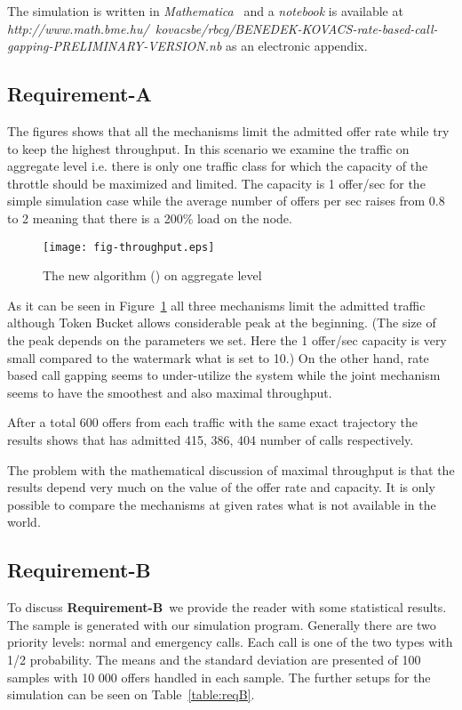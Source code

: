 \documentclass[conference]{IEEEtran}
\newcommand{\comment}[1]{}
\newcommand{\reqA}{\textbf{Requirement-A}}
\newcommand{\reqB}{\textbf{Requirement-B}}
\begin{document}
The simulation is written in \textit{Mathematica}~\cite{MATHEMATICA}
and a \textit{notebook} is available at
\textit{http://www.math.bme.hu/~kovacsbe/rbcg/BENEDEK-KOVACS-rate-based-call-gapping-PRELIMINARY-VERSION.nb}
as an electronic appendix. \comment{One can also download
demonstrations from the internet page of \textit{Wolfram Inc.}.}


\subsection{\reqA}
The figures shows that all the mechanisms limit the admitted offer
rate while try to keep the highest throughput. In this scenario we
examine the traffic on aggregate level i.e. there is only one
traffic class for which the capacity of the throttle should be
maximized and limited. The capacity is 1 offer/sec for the simple
simulation case while the average number of offers per sec raises
from 0.8 to 2 meaning that there is a 200\% load on the node.

\begin{figure}[h]
\begin{center}
\texttt{[image: fig-throughput.eps]}
\end{center}
\caption{The new algorithm () on aggregate
level}\label{fig:throughput}
\end{figure}

As it can be seen in Figure~\ref{fig:throughput} all three
mechanisms limit the admitted traffic although Token Bucket allows
considerable peak at the beginning. (The size of the peak depends on
the parameters we set. Here the 1 offer/sec capacity is very small
compared to the watermark what is set to 10.) On the other hand,
rate based call gapping seems to under-utilize the system while the
joint mechanism seems to have the smoothest and also maximal
throughput.

After a total 600 offers from each traffic with the same exact
trajectory the results shows that  has
admitted 415, 386, 404 number of calls respectively.

The problem with the mathematical discussion of maximal throughput
is that the results depend very much on the value of the offer rate
and capacity. It is only possible to compare the mechanisms at given
rates what is not available in the world.

\subsection{\reqB\ }
To discuss \reqB\ we provide the reader with some statistical
results. The sample is generated with our simulation program.
Generally there are two priority levels: normal and emergency calls.
Each call is one of the two types with 1/2 probability. The means
and the standard deviation are presented of 100 samples with 10 000
offers handled in each sample. The further setups for the simulation
can be seen on Table~\ref{table:reqB}.
\end{document}
